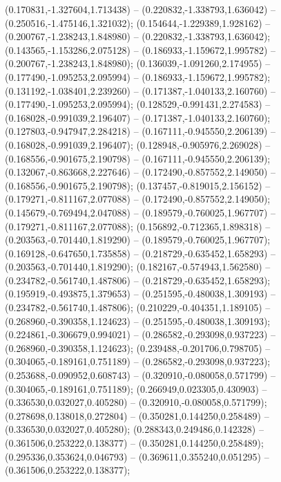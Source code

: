  (0.170831,-1.327604,1.713438) -- (0.220832,-1.338793,1.636042) -- (0.250516,-1.475146,1.321032);
 (0.154644,-1.229389,1.928162) -- (0.200767,-1.238243,1.848980) -- (0.220832,-1.338793,1.636042);
 (0.143565,-1.153286,2.075128) -- (0.186933,-1.159672,1.995782) -- (0.200767,-1.238243,1.848980);
 (0.136039,-1.091260,2.174955) -- (0.177490,-1.095253,2.095994) -- (0.186933,-1.159672,1.995782);
 (0.131192,-1.038401,2.239260) -- (0.171387,-1.040133,2.160760) -- (0.177490,-1.095253,2.095994);
 (0.128529,-0.991431,2.274583) -- (0.168028,-0.991039,2.196407) -- (0.171387,-1.040133,2.160760);
 (0.127803,-0.947947,2.284218) -- (0.167111,-0.945550,2.206139) -- (0.168028,-0.991039,2.196407);
 (0.128948,-0.905976,2.269028) -- (0.168556,-0.901675,2.190798) -- (0.167111,-0.945550,2.206139);
 (0.132067,-0.863668,2.227646) -- (0.172490,-0.857552,2.149050) -- (0.168556,-0.901675,2.190798);
 (0.137457,-0.819015,2.156152) -- (0.179271,-0.811167,2.077088) -- (0.172490,-0.857552,2.149050);
 (0.145679,-0.769494,2.047088) -- (0.189579,-0.760025,1.967707) -- (0.179271,-0.811167,2.077088);
 (0.156892,-0.712365,1.898318) -- (0.203563,-0.701440,1.819290) -- (0.189579,-0.760025,1.967707);
 (0.169128,-0.647650,1.735858) -- (0.218729,-0.635452,1.658293) -- (0.203563,-0.701440,1.819290);
 (0.182167,-0.574943,1.562580) -- (0.234782,-0.561740,1.487806) -- (0.218729,-0.635452,1.658293);
 (0.195919,-0.493875,1.379653) -- (0.251595,-0.480038,1.309193) -- (0.234782,-0.561740,1.487806);
 (0.210229,-0.404351,1.189105) -- (0.268960,-0.390358,1.124623) -- (0.251595,-0.480038,1.309193);
 (0.224861,-0.306679,0.994021) -- (0.286582,-0.293098,0.937223) -- (0.268960,-0.390358,1.124623);
 (0.239488,-0.201706,0.798705) -- (0.304065,-0.189161,0.751189) -- (0.286582,-0.293098,0.937223);
 (0.253688,-0.090952,0.608743) -- (0.320910,-0.080058,0.571799) -- (0.304065,-0.189161,0.751189);
 (0.266949,0.023305,0.430903) -- (0.336530,0.032027,0.405280) -- (0.320910,-0.080058,0.571799);
 (0.278698,0.138018,0.272804) -- (0.350281,0.144250,0.258489) -- (0.336530,0.032027,0.405280);
 (0.288343,0.249486,0.142328) -- (0.361506,0.253222,0.138377) -- (0.350281,0.144250,0.258489);
 (0.295336,0.353624,0.046793) -- (0.369611,0.355240,0.051295) -- (0.361506,0.253222,0.138377);
